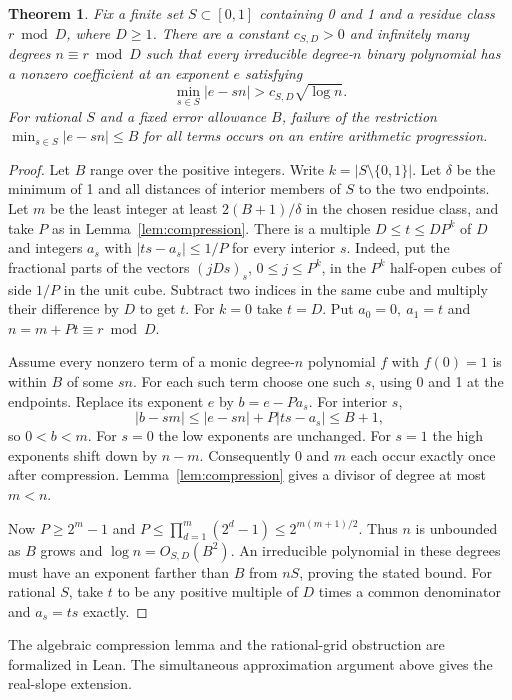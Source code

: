 \documentclass[11pt]{article}
\newtheorem{theorem}{Theorem}
\begin{document}
\begin{theorem}\label{thm:bands}
Fix a finite set \(S\subset[0,1]\) containing 0 and 1 and a residue class
\(r\bmod D\), where \(D\ge1\). There are a constant \(c_{S,D}>0\)
and infinitely many degrees \(n\equiv r\bmod D\) such that every irreducible
degree-\(n\) binary polynomial has a nonzero coefficient at an exponent \(e\)
satisfying
\[
                 \min_{s\in S}|e-sn|>c_{S,D}\sqrt{\log n}.
\]
For rational \(S\) and a fixed error allowance \(B\), failure of the restriction
\(\min_{s\in S}|e-sn|\le B\) for all terms occurs on an entire arithmetic progression.
\end{theorem}
\begin{proof}
Let \(B\) range over the positive integers. Write \(k=|S\setminus\{0,1\}|\).
Let \(\delta\) be the minimum of 1 and all distances of interior members of \(S\)
to the two endpoints. Let \(m\) be the least integer at least \(2(B+1)/\delta\)
in the chosen residue class, and take \(P\) as in Lemma~\ref{lem:compression}.
There is a multiple \(D\le t\le DP^k\) of \(D\) and integers \(a_s\)
with \(|ts-a_s|\le 1/P\) for every interior \(s\).
Indeed, put the fractional parts of the vectors \((jDs)_s\), \(0\le j\le P^k\),
in the \(P^k\) half-open cubes of side \(1/P\) in the unit cube. Subtract two
indices in the same cube and multiply their difference by \(D\) to get \(t\).
For \(k=0\) take \(t=D\). Put \(a_0=0,\ a_1=t\) and \(n=m+Pt\equiv r\bmod D\).

Assume every nonzero term of a monic degree-\(n\) polynomial \(f\) with
\(f(0)=1\) is within \(B\) of some \(sn\). For each such term choose one such
\(s\), using 0 and 1 at the endpoints. Replace its exponent \(e\) by
\(b=e-Pa_s\). For interior \(s\),
\[
 |b-sm|\le |e-sn|+P|ts-a_s|\le B+1,
\]
so \(0<b<m\). For \(s=0\) the low exponents are unchanged.
For \(s=1\) the high exponents shift down by \(n-m\).
Consequently 0 and \(m\) each occur exactly once after compression.
Lemma~\ref{lem:compression} gives a divisor of degree at most \(m<n\).

Now \(P\ge2^m-1\) and \(P\le\prod_{d=1}^m(2^d-1)\le2^{m(m+1)/2}\).
Thus \(n\) is unbounded as \(B\) grows and \(\log n=O_{S,D}(B^2)\).
An irreducible polynomial in these degrees must have an exponent farther than
\(B\) from \(nS\), proving the stated bound. For rational \(S\), take \(t\)
to be any positive multiple of \(D\) times a common denominator and \(a_s=ts\) exactly.
\end{proof}
The algebraic compression lemma and the rational-grid obstruction are formalized
in Lean. The simultaneous approximation argument above gives the real-slope extension.
\end{document}
